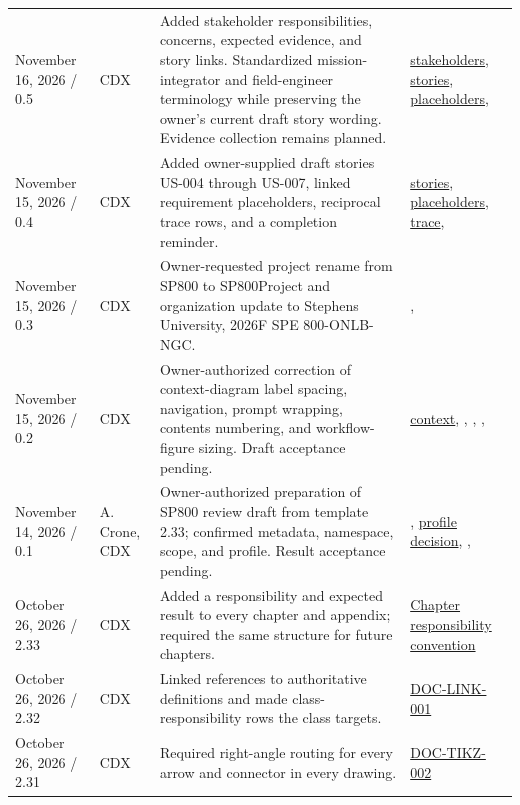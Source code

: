 \begin{tabularx}{\linewidth}{L{3.1cm}L{2.2cm}YL{2.0cm}}
November 16, 2026 / 0.5 & CDX & Added stakeholder responsibilities, concerns, expected evidence, and story links. Standardized mission-integrator and field-engineer terminology while preserving the owner's current draft story wording. Evidence collection remains planned. & \hyperref[Table:StakeholderDefinitions]{stake\-holders}, \hyperref[Table:UserStories]{stories}, \hyperref[Table:PendingStoryRequirements]{placeholders}, \\
November 15, 2026 / 0.4 & CDX & Added owner-supplied draft stories US-004 through US-007, linked requirement placeholders, reciprocal trace rows, and a completion reminder. & \hyperref[Table:UserStories]{stories}, \hyperref[Table:PendingStoryRequirements]{placeholders}, \hyperref[Table:TraceabilityMatrix]{trace}, \\
November 15, 2026 / 0.3 & CDX & Owner-requested project rename from SP800 to SP800Project and organization update to Stephens University, 2026F SPE 800-ONLB-NGC. & , \\
November 15, 2026 / 0.2 & CDX & Owner-authorized correction of context-diagram label spacing, navigation, prompt wrapping, contents numbering, and workflow-figure sizing. Draft acceptance pending. & \hyperref[Figure:SP800Context]{context}, , , , \\
November 14, 2026 / 0.1 & A. Crone, CDX & Owner-authorized preparation of SP800 review draft from template 2.33; confirmed metadata, namespace, scope, and profile. Result acceptance pending. & , \hyperref[Table:ProjectDomainProfiles]{profile decision}, , \\
October 26, 2026 / 2.33 & CDX & Added a responsibility and expected result to every chapter and appendix; required the same structure for future chapters. & \hyperref[Section:ChapterResponsibilityConvention]{Chapter responsibility convention}\\
October 26, 2026 / 2.32 & CDX & Linked references to authoritative definitions and made class-responsibility rows the class targets. & \hyperref[Requirement:DOCLINK001]{DOC-LINK-001}\\
October 26, 2026 / 2.31 & CDX & Required right-angle routing for every arrow and connector in every drawing. & \hyperref[Requirement:DOCTIKZ002]{DOC-TIKZ-002}\\

\end{tabularx}
